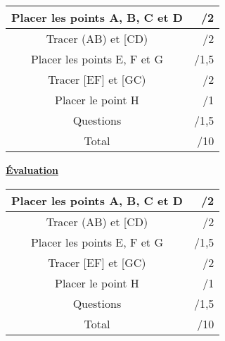 \documentclass[a4paper,11pt]{article}
\begin{document}
\begin{tabular}{|c|r|}
\hline 
Placer les points A, B, C et D &              /2 \\ 
\hline 
Tracer (AB) et [CD) & /2 \\ 
\hline 
Placer les points E, F et G & /1,5 \\ 
\hline 
Tracer [EF] et [GC) & /2 \\ 
\hline 
Placer le point H & /1 \\ 
\hline 
Questions  & /1,5 \\ 
\hline 
Total  & /10 \\ 
\hline 
\end{tabular} 


\vspace*{0.8cm}

\textbf{\underline{Évaluation} }\\


\renewcommand{\arraystretch}{1.5} %
\setlength{\tabcolsep}{1.5cm} %

\begin{tabular}{|c|r|}
\hline 
Placer les points A, B, C et D &              /2 \\ 
\hline 
Tracer (AB) et [CD) & /2 \\ 
\hline 
Placer les points E, F et G & /1,5 \\ 
\hline 
Tracer [EF] et [GC) & /2 \\ 
\hline 
Placer le point H & /1 \\ 
\hline 
Questions  & /1,5 \\ 
\hline 
Total  & /10 \\ 
\hline 
\end{tabular} 
\end{document}
